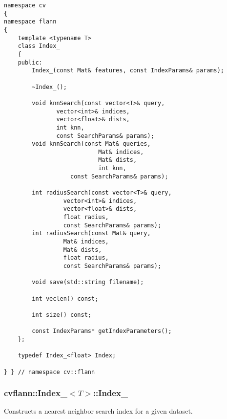 \begin{lstlisting}
namespace cv
{
namespace flann
{
    template <typename T>
    class Index_ 
    {
    public:
	    Index_(const Mat& features, const IndexParams& params);

	    ~Index_();

	    void knnSearch(const vector<T>& query, 
			   vector<int>& indices, 
			   vector<float>& dists, 
			   int knn, 
			   const SearchParams& params);
	    void knnSearch(const Mat& queries, 
                           Mat& indices, 
                           Mat& dists, 
                           int knn, 
		           const SearchParams& params);

	    int radiusSearch(const vector<T>& query, 
			     vector<int>& indices, 
			     vector<float>& dists, 
			     float radius, 
			     const SearchParams& params);
	    int radiusSearch(const Mat& query, 
			     Mat& indices, 
			     Mat& dists, 
			     float radius, 
			     const SearchParams& params);

	    void save(std::string filename);

	    int veclen() const;

	    int size() const;

	    const IndexParams* getIndexParameters();
    };

    typedef Index_<float> Index;

} } // namespace cv::flann
\end{lstlisting}

\ifplastex
{}
\else
\subsubsection{cvflann::Index\_$<T>$::Index\_}\label{cvflann.Index.Index}
\fi
Constructs a nearest neighbor search index for a given dataset.

